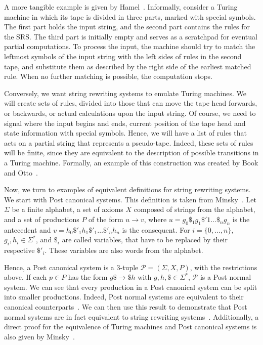 \documentclass[12pt]{article}
\begin{document}
A more tangible example is given by Hamel~\cite{}. Informally, consider a Turing machine in which its tape is divided in three parts, marked with special symbols. The first part holds the input string, and the second part contains the rules for the SRS. The third part is initially empty and serves as a scratchpad for eventual partial computations. To process the input, the machine should try to match the leftmost symbols of the input string with the left sides of rules in the second tape, and substitute them as described by the right side of the earliest matched rule. When no further matching is possible, the computation stops.

Conversely, we want string rewriting systems to emulate Turing machines. We will create sets of rules, divided into those that can move the tape head forwards, or backwards, or actual calculations upon the input string. Of course, we need to signal where the input begins and ends, current position of the tape head and state information with special symbols. Hence, we will have a list of rules that acts on a partial string that represents a pseudo-tape. Indeed, these sets of rules will be finite, since they are equivalent to the description of possible transitions in a Turing machine. Formally, an example of this construction was created by Book and Otto~\cite{}.

Now, we turn to examples of equivalent definitions for string rewriting systems. We start with Post canonical systems. This definition is taken from Minsky~\cite{}. Let $\Sigma$ be a finite alphabet, a set of axioms $X$ composed of strings from the alphabet, and a set of productions $P$ of the form $u \rightarrow v$, where $u = g_{0}\$_{1}g_{1}\$'{1} \dots \$_{n}g_{n}$ is the antecedent and $v = h_{0}\$'_{1}h_{1}\$'_{1} \dots \$'_{n}h_{n}$ is the consequent. For $i = \{0, \dots, n\}$, $g_{i}, h_{i} \in \Sigma^{*}$, and $\$_{i}$ are called variables, that have to be replaced by their respective $\$'_{i}$. These variables are also words from the alphabet.

Hence, a Post canonical system is a $3$-tuple $\mathcal{P} = (\Sigma, X, P)$, with the restrictions above. If each $p \in P$ has the form $g\$ \rightarrow \$h$ with $g, h, \$ \in \Sigma^{*}$, $\mathcal{P}$ is a Post normal system. We can see that every production in a Post canonical system can be split into smaller productions. Indeed, Post normal systems are equivalent to their canonical counterparts~\cite[Theorem 13.1]{}. We can then use this result to demonstrate that Post normal systems are in fact equivalent to string rewriting systems~\cite[Sec. 6.5, Theorem 5.1]{}. Additionally, a direct proof for the equivalence of Turing machines and Post canonical systems is also given by Minsky~\cite[Sec. 12.6]{}.
\end{document}

